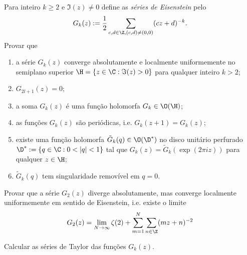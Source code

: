\begin{problema}
Para inteiro $k\geq 2$ e $\Im(z)\neq 0$ define as \emph{séries de Eisenstein} pelo
\begin{equation}
G_k(z) := \frac12 \sum_{c,d\in \Z, (c,d)\neq(0,0)} (cz+d)^{-k} .
\end{equation}
Provar que
\begin{enumerate}
\item a série $G_k(z)$ converge
absolutamente e localmente uniformemente no semiplano superior
$\H = \{z\in\C: \Im(z)>0\}$ para qualquer inteiro $k>2$;
\item $G_{2l+1}(z) = 0$;
\item a soma $G_k(z)$ é uma função holomorfa $G_k \in \O(\H)$;
\item as funções $G_k(z)$ são periódicas, i.e. $G_k(z+1) = G_k(z)$;
\item existe uma função holomorfa $\tilde{G}_k(q) \in \O(\D^*)$
no disco unitário perfurado $\D^* := \{ q\in\C: 0 < |q| < 1 \}$
tal que $G_k(z) = \tilde{G}_k(\exp(2\pi i z))$ para qualquer $z\in\H$;
\item $\tilde{G}_k(q)$ tem singularidade removível em $q=0$.
\end{enumerate}
\end{problema}

\begin{problema}
Provar que a série $G_2(z)$ diverge absolutamente,
mas converge localmente uniformemente em sentido de Eisenstein,
i.e. existe o limite
\begin{equation}
G_2(z) = \lim_{N\to\infty} \zeta(2) + \sum_{m=1}^N \sum_{n\in\Z} (mz+n)^{-2}
\end{equation}
\end{problema}

\begin{problema}
Calcular as séries de Taylor das funções $G_k(z)$.
\end{problema}


